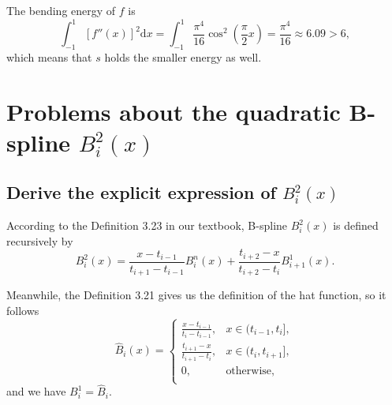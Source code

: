 \documentclass[a4paper]{article}
\begin{document}
The bending energy of $f$ is 
\begin{equation}
  \int_{-1}^{1} [f''(x)]^2 \mathrm{d}x = \int_{-1}^1 \frac{\pi^4}{16}\cos^2 (\frac{\pi}{2}x) = \frac{\pi^4}{16} \approx 6.09 > 6,
\end{equation}
which means that $s$ holds the smaller energy as well.

\section{Problems about the quadratic B-spline $B_i^2(x)$}

\subsection{Derive the explicit expression of $B_i^2(x)$}

According to the Definition 3.23 in our textbook, B-spline $B_i^2(x)$ is defined recursively by
\begin{equation}
  B_i^2(x) = \frac{x - t_{i - 1}}{t_{i + 1} - t_{i - 1}}B_i^n(x) + \frac{t_{i + 2} - x}{t_{i + 2} - t_i}B_{i + 1}^1(x).
  \label{eq:5_B_spline_definition}
\end{equation}

Meanwhile, the Definition 3.21 gives us the definition of the hat function, so it follows
\begin{equation}
  \hat{B}_i(x) = \begin{cases}
    \frac{x - t_{i - 1}}{t_i - t_{i - 1}},& x \in (t_{i - 1}, t_i], \\
    \frac{t_{i + 1} - x}{t_{i + 1} - t_{i}},& x \in (t_i, t_{i + 1}], \\
    0,& \text{otherwise}, \\
  \end{cases}
  \label{eq:5_hat_B_spline_definition}
\end{equation}
and we have $B_i^1 = \hat{B}_i$.
\end{document}
